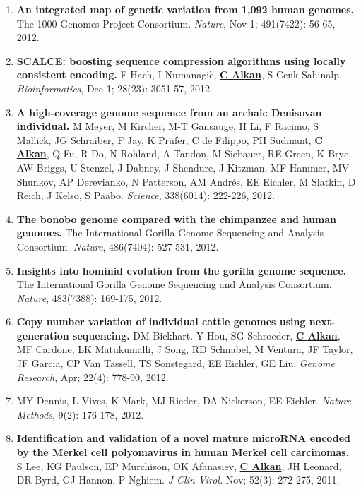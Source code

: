 \begin{enumerate}
       \clearpage 
 \item
        {\bf An integrated map of genetic variation from 1,092 human genomes.}
        The 1000 Genomes Project Consortium. 
        {\em Nature}, Nov 1;  491(7422): 56-65, 2012.
        
 \item
        {\bf SCALCE: boosting sequence compression algorithms using locally consistent encoding.}
        F Hach, I Numanagi\`{c}, {\bf {\underline {C Alkan}}}, S Cenk Sahinalp.  
        {\em Bioinformatics}, Dec 1;  28(23): 3051-57, 2012.

 \item
        {\bf A high-coverage genome sequence from an archaic Denisovan individual.}
        M Meyer, M Kircher, M-T Gansauge, H Li, F Racimo, S Mallick, JG Schraiber, F Jay, K Pr\"{u}fer, C de Filippo, PH Sudmant, 
        {\bf {\underline {C Alkan}}}, Q Fu, R Do, N Rohland, A Tandon, M Siebauer, RE Green, 
        K Bryc, AW Briggs, U Stenzel, J Dabney, J Shendure, J Kitzman, MF Hammer, MV Shunkov, 
        AP Derevianko, N Patterson, AM Andr\'{e}s, EE Eichler, M Slatkin, D Reich, J Kelso, S P\"{a}\"{a}bo. 
        {\em Science}, 338(6014): 222-226, 2012.

 \item
        {\bf The bonobo genome compared with the chimpanzee and human genomes.}
        The International Gorilla Genome Sequencing and Analysis Consortium.
        {\em Nature}, 486(7404): 527-531, 2012.


\item
{\bf Insights into hominid evolution from the gorilla genome sequence.}
The International Gorilla Genome Sequencing and Analysis Consortium.
{\em Nature}, 483(7388): 169-175, 2012. 

\item
{\bf Copy number variation of individual cattle genomes using next-generation sequencing.} 
DM Bickhart. Y Hou, SG Schroeder, {\bf {\underline {C Alkan}}}, MF Cardone, LK Matukumalli, J Song, 
RD Schnabel, M Ventura, JF Taylor, JF Garcia, CP Van Tassell, TS Sonstegard, EE Eichler, GE Liu. 
{\em Genome Research}, Apr;  22(4): 778-90, 2012.

\item
MY Dennis, L Vives, K Mark, MJ Rieder, DA Nickerson, EE Eichler. {\em Nature Methods}, 9(2): 176-178, 2012.


\item
{\bf Identification and validation of a novel mature microRNA encoded by the Merkel cell polyomavirus in human Merkel cell carcinomas.}
S Lee, KG Paulson, EP Murchison, OK Afanasiev, {\bf {\underline {C Alkan}}}, JH Leonard, DR Byrd, GJ Hannon, 
P Nghiem. {\em J Clin Virol.} Nov;  52(3): 272-275, 2011. 



\end{enumerate}

